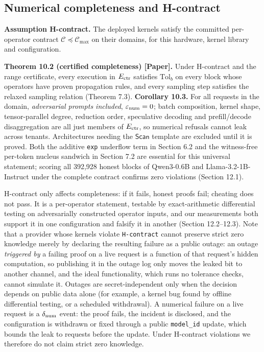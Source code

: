\documentclass[10pt]{article}
\begin{document}
\subsection{Numerical completeness and H-contract}
\textbf{Assumption H-contract.} The deployed kernels satisfy the committed per-operator contract $\mathcal C\preceq\mathcal C_{\max}$ on their domains, for this hardware, kernel library and configuration.

\textbf{Theorem 10.2 (certified completeness) [Paper].} Under H-contract and the range certificate, every execution in $E_{\rm ctr}$ satisfies $\mathrm{Tol}_b$ on every block whose operators have proven propagation rules, and every sampling step satisfies the relaxed sampling relation (Theorem 7.3). \textbf{Corollary 10.3.} For all requests in the domain, \emph{adversarial prompts included}, $\varepsilon_{\rm num}=0$; batch composition, kernel shape, tensor-parallel degree, reduction order, speculative decoding and prefill/decode disaggregation are all just members of $E_{\rm ctr}$, so numerical refusals cannot leak across tenants. Architectures needing the $\mathsf{Scan}$ template are excluded until it is proved. Both the additive \texttt{exp} underflow term in Section 6.2 and the witness-free per-token nucleus sandwich in Section 7.2 are essential for this universal statement; scoring all 392,928 honest blocks of Qwen3-0.6B and Llama-3.2-1B-Instruct under the complete contract confirms zero violations (Section 12.1).

H-contract only affects completeness: if it fails, honest proofs fail; cheating does not pass. It is a per-operator statement, testable by exact-arithmetic differential testing on adversarially constructed operator inputs, and our measurements both support it in one configuration and falsify it in another (Section 12.2--12.3). Note that a provider whose kernels violate \texttt{H-contract} cannot preserve strict zero knowledge merely by declaring the resulting failure as a public outage: an outage \emph{triggered by} a failing proof on a live request is a function of that request's hidden computation, so publishing it in the outage log only moves the leaked bit to another channel, and the ideal functionality, which runs no tolerance checks, cannot simulate it. Outages are secret-independent only when the decision depends on public data alone (for example, a kernel bug found by offline differential testing, or a scheduled withdrawal). A numerical failure on a live request is a $\delta_{\rm num}$ event: the proof fails, the incident is disclosed, and the configuration is withdrawn or fixed through a public \texttt{model\_\allowbreak{}id} update, which bounds the leak to requests before the update. Under H-contract violations we therefore do not claim strict zero knowledge.
\end{document}
